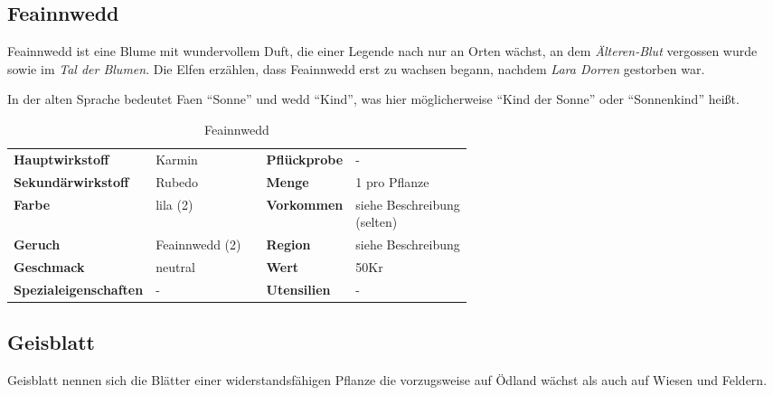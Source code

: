 \subsection{Feainnwedd}
Feainnwedd ist eine Blume mit wundervollem Duft, die einer Legende nach nur an Orten wächst, an dem \textit{Älteren-Blut} vergossen wurde sowie im \textit{Tal der Blumen}. Die Elfen erzählen, dass Feainnwedd erst zu wachsen begann, nachdem \textit{Lara Dorren} gestorben war.

In der alten Sprache bedeutet Faen "`Sonne"' und wedd "`Kind"', was hier möglicherweise "`Kind der Sonne"' oder "`Sonnenkind"' heißt. 

\begin{table}[H] 
\begin{center} 
\begin{tabular}{|l|l|p{1cm}|l|l|} 
  	\cline{1-2} \cline{4-5} 
  	\textbf{Hauptwirkstoff} & Karmin && \textbf{Pflückprobe} & - \\ \cline{1-2} \cline{4-5} 
  	\textbf{Sekundärwirkstoff} & Rubedo && \textbf{Menge} & 1 pro Pflanze \\ \cline{1-2} \cline{4-5} 
  	\textbf{Farbe} & lila (2) && \textbf{Vorkommen} & \brcell{siehe Beschreibung \\ (selten)} \\ \cline{1-2} \cline{4-5} 
  	\textbf{Geruch} & Feainnwedd (2) && \textbf{Region} & siehe Beschreibung \\ \cline{1-2} \cline{4-5} 
  	\textbf{Geschmack} & neutral && \textbf{Wert} & 50Kr \\ \cline{1-2} \cline{4-5} 
  	\textbf{Spezialeigenschaften} & - && \textbf{Utensilien} & - \\ \cline{1-2} \cline{4-5} 
\end{tabular} 
\end{center} 
\caption{Feainnwedd} 
\label{tab:feainnwedd} 
\end{table}


\subsection{Geisblatt}
Geisblatt nennen sich die Blätter einer widerstandsfähigen Pflanze die vorzugsweise auf Ödland wächst als auch auf Wiesen und Feldern. 

